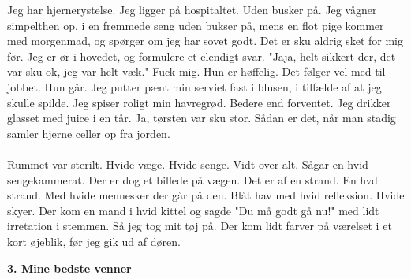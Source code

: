 \documentclass[]{article}
\begin{document}
Jeg har hjernerystelse. Jeg ligger på hospitaltet. Uden busker på. Jeg vågner simpelthen op, i en fremmede seng uden bukser på, mens en flot pige kommer med morgenmad, og spørger om jeg har sovet godt. Det er sku aldrig sket for mig før. Jeg er ør i hovedet, og formulere et elendigt svar. "Jaja, helt sikkert der, det var sku ok, jeg var helt væk." Fuck mig. Hun er høffelig. Det følger vel med til jobbet. Hun går. Jeg putter pænt min serviet fast i blusen, i tilfælde af at jeg skulle spilde. Jeg spiser roligt min havregrød. Bedere end forventet. Jeg drikker glasset med juice i en tår. Ja, tørsten var sku stor. Sådan er det, når man stadig samler hjerne celler op fra jorden.
\\ \\
Rummet var sterilt. Hvide væge. Hvide senge. Vidt over alt. Sågar en hvid sengekammerat. Der er dog et billede på vægen. Det er af en strand. En hvd strand. Med hvide mennesker der går på den. Blåt hav med hvid refleksion. Hvide skyer. Der kom en mand i hvid kittel og sagde "Du må godt gå nu!" med lidt irretation i stemmen. Så jeg tog mit tøj på. Der kom lidt farver på værelset i et kort øjeblik, før jeg gik ud af døren.

\begin{center}
	\large\textbf{3. Mine bedste venner}
\end{center}
\end{document}
